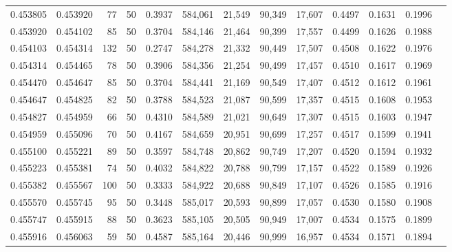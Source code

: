 \begin{tabular}{rrrrrrrrrrrrr}
0.453805 & 0.453920 &    77 &  50 &                                     0.3937 & 584,061 &  21,549 &  90,349 &  17,607 & 0.4497 & 0.1631 & 0.1996 \\
0.453920 & 0.454102 &    85 &  50 &                                     0.3704 & 584,146 &  21,464 &  90,399 &  17,557 & 0.4499 & 0.1626 & 0.1988 \\
0.454103 & 0.454314 &   132 &  50 &                                     0.2747 & 584,278 &  21,332 &  90,449 &  17,507 & 0.4508 & 0.1622 & 0.1976 \\
0.454314 & 0.454465 &    78 &  50 &                                     0.3906 & 584,356 &  21,254 &  90,499 &  17,457 & 0.4510 & 0.1617 & 0.1969 \\
0.454470 & 0.454647 &    85 &  50 &                                     0.3704 & 584,441 &  21,169 &  90,549 &  17,407 & 0.4512 & 0.1612 & 0.1961 \\
0.454647 & 0.454825 &    82 &  50 &                                     0.3788 & 584,523 &  21,087 &  90,599 &  17,357 & 0.4515 & 0.1608 & 0.1953 \\
0.454827 & 0.454959 &    66 &  50 &                                     0.4310 & 584,589 &  21,021 &  90,649 &  17,307 & 0.4515 & 0.1603 & 0.1947 \\
0.454959 & 0.455096 &    70 &  50 &                                     0.4167 & 584,659 &  20,951 &  90,699 &  17,257 & 0.4517 & 0.1599 & 0.1941 \\
0.455100 & 0.455221 &    89 &  50 &                                     0.3597 & 584,748 &  20,862 &  90,749 &  17,207 & 0.4520 & 0.1594 & 0.1932 \\
0.455223 & 0.455381 &    74 &  50 &                                     0.4032 & 584,822 &  20,788 &  90,799 &  17,157 & 0.4522 & 0.1589 & 0.1926 \\
0.455382 & 0.455567 &   100 &  50 &                                     0.3333 & 584,922 &  20,688 &  90,849 &  17,107 & 0.4526 & 0.1585 & 0.1916 \\
0.455570 & 0.455745 &    95 &  50 &                                     0.3448 & 585,017 &  20,593 &  90,899 &  17,057 & 0.4530 & 0.1580 & 0.1908 \\
0.455747 & 0.455915 &    88 &  50 &                                     0.3623 & 585,105 &  20,505 &  90,949 &  17,007 & 0.4534 & 0.1575 & 0.1899 \\
0.455916 & 0.456063 &    59 &  50 &                                     0.4587 & 585,164 &  20,446 &  90,999 &  16,957 & 0.4534 & 0.1571 & 0.1894 \\

\end{tabular}
